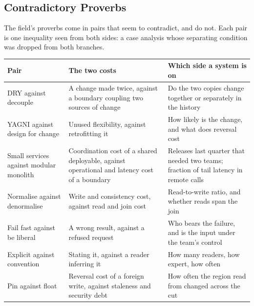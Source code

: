 \documentclass[11pt,oneside]{article}
\theoremstyle{definition}
\theoremstyle{remark}
\begin{document}
\subsection{Contradictory Proverbs}\label{sec:pairs}

The field's proverbs come in pairs that seem to contradict, and do not. Each pair is one
inequality seen from both sides: a case analysis whose separating condition was dropped
from both branches.

\begin{center}
\small
\begin{longtable}{@{}p{}p{}p{}@{}}
\toprule
\textbf{Pair} & \textbf{The two costs} & \textbf{Which side a system is on} \\
\midrule
\endhead
DRY against decouple & A change made twice, against a boundary coupling two sources of
change & Do the two copies change together or separately in the history \\
\addlinespace
YAGNI against design for change & Unused flexibility, against retrofitting it & How likely
is the change, and what does reversal cost \\
\addlinespace
Small services against modular monolith & Coordination cost of a shared deployable, against
operational and latency cost of a boundary & Releases last quarter that needed two teams;
fraction of tail latency in remote calls \\
\addlinespace
Normalise against denormalise & Write and consistency cost, against read and join cost &
Read-to-write ratio, and whether reads span the join \\
\addlinespace
Fail fast against be liberal & A wrong result, against a refused request & Who bears the
failure, and is the input under the team's control \\
\addlinespace
Explicit against convention & Stating it, against a reader inferring it & How many readers,
how expert, how often \\
\addlinespace
Pin against float & Reversal cost of a foreign write, against staleness and security debt &
How often the region read from changed across the cut \\
\bottomrule
\end{longtable}
\end{center}
\end{document}
